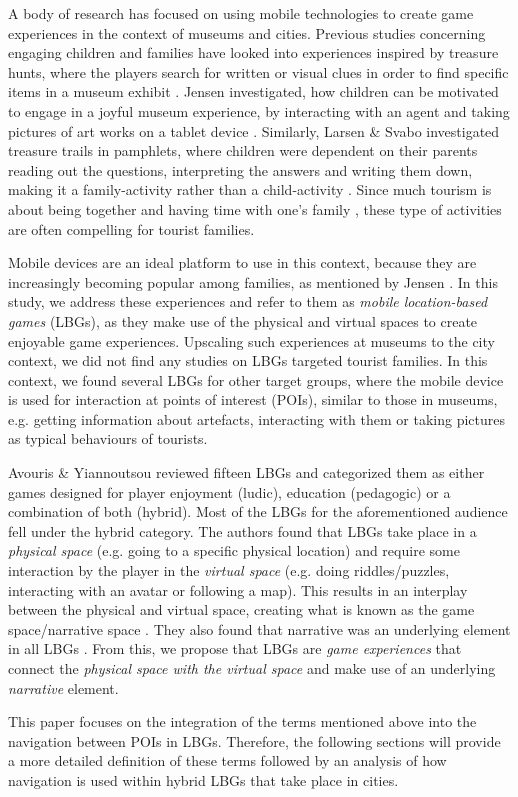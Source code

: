 A body of research has focused on using mobile technologies to create game experiences in the context of museums and cities. Previous studies concerning engaging children and families have looked into experiences inspired by treasure hunts, where the players search for written or visual clues in order to find specific items in a museum exhibit \cite{Lynge} \cite{larsen2014tourist}. Jensen investigated, how children can be motivated to engage in a joyful museum experience, by interacting with an agent and taking pictures of art works on a tablet device \cite{Lynge}. Similarly, Larsen \& Svabo investigated treasure trails in pamphlets, where children were dependent on their parents reading out the questions, interpreting the answers and writing them down, making it a family-activity rather than a child-activity \cite{larsen2014tourist}. Since much tourism is about being together and having time with one’s family \cite{larsen2014tourist}, these type of activities are often compelling for tourist families. 

Mobile devices are an ideal platform to use in this context, because they are increasingly becoming popular among families, as mentioned by Jensen \cite{Lynge}. In this study, we address these experiences and refer to them as \textit{mobile location-based games} (LBGs), as they make use of the physical and virtual spaces to create enjoyable game experiences. Upscaling such experiences at museums to the city context, we did not find any studies on LBGs targeted tourist families. In this context, we found several LBGs for other target groups, where the mobile device is used for interaction at points of interest (POIs), similar to those in museums, e.g. getting information about artefacts, interacting with them or taking pictures as typical behaviours of tourists. 

Avouris \& Yiannoutsou reviewed fifteen LBGs and categorized them as either games designed for player enjoyment (ludic), education (pedagogic) or a combination of both (hybrid). Most of the LBGs for the aforementioned audience fell under the hybrid category. The authors found that LBGs take place in a \textit{physical space} (e.g. going to a specific physical location) and require some interaction by the player in the \textit{virtual space} (e.g. doing riddles/puzzles, interacting with an avatar or following a map). This results in an interplay between the physical and virtual space, creating what is known as the game space/narrative space \cite{LBG_Review}. They also found that narrative was an underlying element in all LBGs \cite{LBG_Review}. From this, we propose that LBGs are \textit{game experiences} that connect the \textit{physical space with the virtual space} and make use of an underlying \textit{narrative} element.

This paper focuses on the integration of the terms mentioned above into the navigation between POIs in LBGs. Therefore, the following sections will provide a more detailed definition of these terms followed by an analysis of how navigation is used within hybrid LBGs that take place in cities.